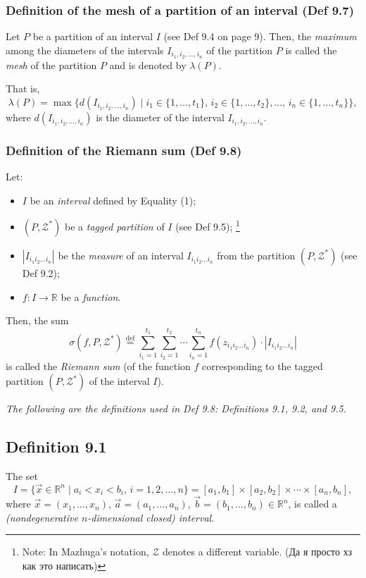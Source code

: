 \subsubsection{Definition of the mesh of a partition of an interval (Def 9.7)}

Let $P$ be a partition of an interval $I$ (see Def 9.4 on page 9). Then, the \textit{maximum} among the diameters of the intervals $I_{i_1, i_2, \dots, i_n}$ of the partition $P$ is called the \textit{mesh} of the partition $P$ and is denoted by $\lambda(P)$.

That is,
\[
    \lambda(P) = \max \{d(I_{i_1, i_2, \dots, i_n}) \mid i_1 \in \{1, \dots, t_1\}, \, i_2 \in \{1, \dots, t_2\}, \dots, \, i_n \in \{1, \dots, t_n\} \},
\]
where $d(I_{i_1, i_2, \dots, i_n})$ is the diameter of the interval $I_{i_1, i_2, \dots, i_n}$.

\subsubsection{Definition of the Riemann sum (Def 9.8)}

Let:
\begin{itemize}
    \item $I$ be an \textit{interval} defined by Equality (1);
    \item $(P, \mathcal{Z}^*)$ be a \textit{tagged partition} of $I$ (see Def 9.5);%
    \footnote{Note: In Mazhuga's notation, $\mathcal{Z}$ denotes a different variable. (Да я просто хз как это написать)}
    \item $|I_{i_1 i_2 \dots i_n}|$ be the \textit{measure} of an interval $I_{i_1 i_2 \dots i_n}$ from the partition $(P, \mathcal{Z}^*)$ (see Def 9.2);
    \item $f: I \to \mathbb{R}$ be a \textit{function}.
\end{itemize}

Then, the sum
\[
    \sigma(f, P, \mathcal{Z}^*) \overset{\text{def}}{=}
    \sum_{i_1 = 1}^{t_1} \sum_{i_2 = 1}^{t_2} \cdots \sum_{i_n = 1}^{t_n} f(z_{i_1 i_2 \dots i_n}) \cdot |I_{i_1 i_2 \dots i_n}|
\]
is called the \textit{Riemann sum} (of the function $f$ corresponding to the tagged partition $(P, \mathcal{Z}^*)$ of the interval $I$).

\noindent \textit{The following are the definitions used in Def 9.8: Definitions 9.1, 9.2, and 9.5.}

\vspace{1em}

\subsection*{Definition 9.1}
The set
\[
    I = \{ \vec{x} \in \mathbb{R}^n \mid a_i < x_i < b_i, \, i = 1, 2, \dots, n \}
    = [a_1, b_1] \times [a_2, b_2] \times \cdots \times [a_n, b_n],
\]
where $\vec{x} = (x_1, \dots, x_n)$, $\vec{a} = (a_1, \dots, a_n)$, $\vec{b} = (b_1, \dots, b_n) \in \mathbb{R}^n$,
is called a \textit{(nondegenerative $n$-dimensional closed) interval}.

